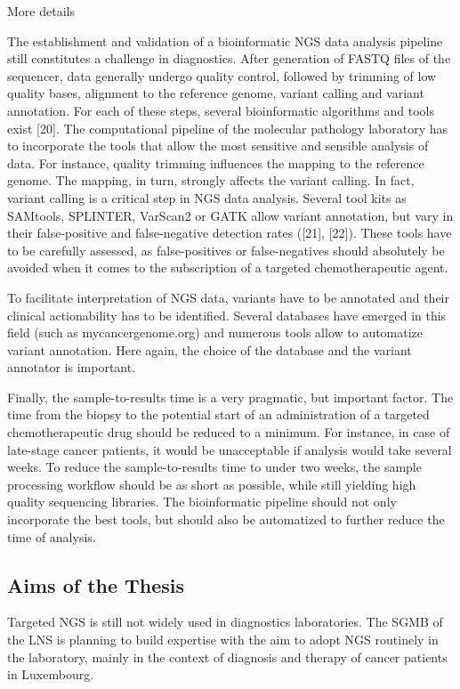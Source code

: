More details

The establishment and validation of a bioinformatic NGS data analysis pipeline
still constitutes a challenge in diagnostics. After generation of FASTQ files of
the sequencer, data generally undergo quality control, followed by trimming of
low quality bases, alignment to the reference genome, variant calling and
variant annotation. For each of these steps, several bioinformatic algorithms
and tools exist [20]. The computational pipeline of the molecular pathology
laboratory has to incorporate the tools that allow the most sensitive and
sensible analysis of data. For instance, quality trimming influences the mapping
to the reference genome. The mapping, in turn, strongly affects the variant
calling. In fact, variant calling is a critical step in NGS data analysis.
Several tool kits as SAMtools, SPLINTER, VarScan2 or GATK allow variant
annotation, but vary in their false-positive and false-negative detection rates
([21], [22]). These tools have to be carefully assessed, as false-positives or
false-negatives should absolutely be avoided when it comes to the subscription
of a targeted chemotherapeutic agent.

To facilitate interpretation of NGS data, variants have to be annotated and
their clinical actionability has to be identified. Several databases have
emerged in this field (such as mycancergenome.org) and numerous tools allow to
automatize variant annotation. Here again, the choice of the database and the
variant annotator is important.

Finally, the sample-to-results time is a very pragmatic, but important factor.
The time from the biopsy to the potential start of an administration of a
targeted chemotherapeutic drug should be reduced to a minimum. For instance, in
case of late-stage cancer patients, it would be unacceptable if analysis would
take several weeks. To reduce the sample-to-results time to under two weeks, the
sample processing workflow should be as short as possible, while still yielding
high quality sequencing libraries. The bioinformatic pipeline should not only
incorporate the best tools, but should also be automatized to further reduce the
time of analysis.

\subsection{Aims of the Thesis}
Targeted NGS is still not widely used in diagnostics laboratories. The SGMB of the LNS
is planning to build expertise with the aim to adopt NGS routinely in the laboratory,
mainly in the context of diagnosis and therapy of cancer patients in Luxembourg.

